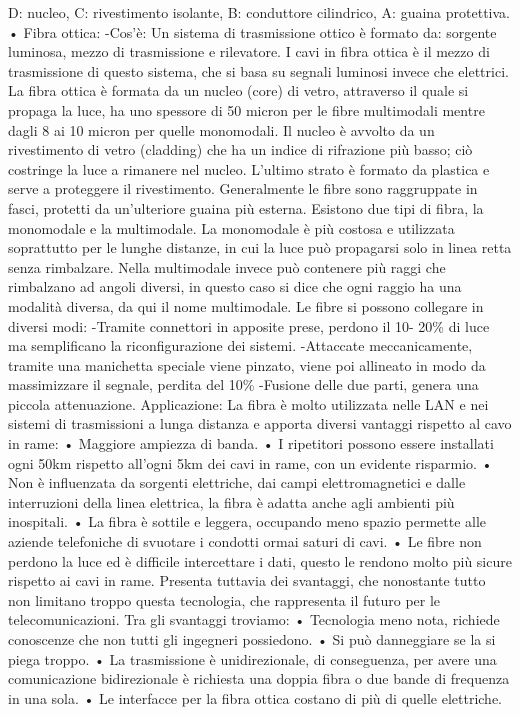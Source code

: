 D: nucleo, C: rivestimento isolante, B: conduttore cilindrico, A: guaina protettiva.
•	Fibra ottica:
-Cos’è: Un sistema di trasmissione ottico è formato da: sorgente luminosa, mezzo di trasmissione e rilevatore. I cavi in fibra ottica è il mezzo di trasmissione di questo sistema, che si basa su segnali luminosi invece che elettrici.
La fibra ottica è formata da un nucleo (core) di vetro, attraverso il quale si propaga la luce, ha uno spessore di 50 micron per le fibre multimodali mentre dagli 8 ai 10 micron per quelle monomodali.
Il nucleo è avvolto da un rivestimento di vetro (cladding) che ha un indice di rifrazione più basso; ciò costringe la luce a rimanere nel nucleo. L’ultimo strato è formato da plastica e serve a proteggere il rivestimento. Generalmente le fibre sono raggruppate in fasci, protetti da un’ulteriore guaina più esterna.  
Esistono due tipi di fibra, la monomodale e la multimodale. La monomodale è più costosa e utilizzata soprattutto per le lunghe distanze, in cui la luce può propagarsi solo in linea retta senza rimbalzare.
Nella multimodale invece può contenere più raggi che rimbalzano ad angoli diversi, in questo caso si dice che ogni raggio ha una modalità diversa, da qui il nome multimodale.
Le fibre si possono collegare in diversi modi: -Tramite connettori in apposite prese, perdono il 10-   20\% di luce ma semplificano la riconfigurazione dei sistemi.
-Attaccate meccanicamente, tramite una manichetta speciale viene pinzato, viene poi allineato in modo da massimizzare il segnale, perdita del 10\%
-Fusione delle due parti, genera una piccola attenuazione.
Applicazione: La fibra è molto utilizzata nelle LAN e nei sistemi di trasmissioni a lunga distanza e apporta diversi vantaggi rispetto al cavo in rame:
•	Maggiore ampiezza di banda.
•	I ripetitori possono essere installati ogni 50km rispetto all’ogni 5km dei cavi in rame, con un evidente risparmio.
•	Non è influenzata da sorgenti elettriche, dai campi elettromagnetici e dalle interruzioni della linea elettrica, la fibra è adatta anche agli ambienti più inospitali.
•	La fibra è sottile e leggera, occupando meno spazio permette alle aziende telefoniche di svuotare i condotti ormai saturi di cavi.
•	Le fibre non perdono la luce ed è difficile intercettare i dati, questo le rendono molto più sicure rispetto ai cavi in rame.
Presenta tuttavia dei svantaggi, che nonostante tutto non limitano troppo questa tecnologia, che rappresenta il futuro per le telecomunicazioni. Tra gli svantaggi troviamo:
•	Tecnologia meno nota, richiede conoscenze che non tutti gli ingegneri possiedono.
•	Si può danneggiare se la si piega troppo.
•	La trasmissione è unidirezionale, di conseguenza, per avere una comunicazione bidirezionale è richiesta una doppia fibra o due bande di frequenza in una sola.
•	Le interfacce per la fibra ottica costano di più di quelle elettriche.


